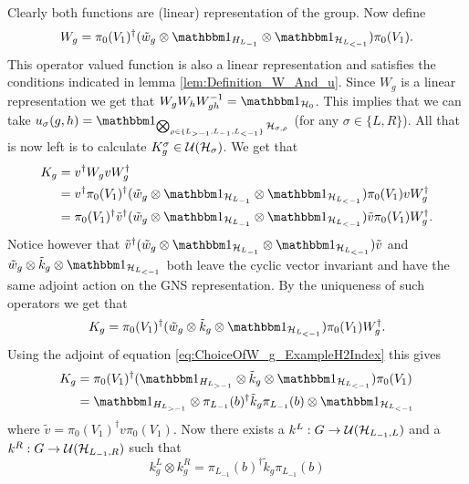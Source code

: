 \documentclass[12pt,a4paper,twoside]{article}
\numberwithin{equation}{section}
\begin{document}
Clearly both functions are (linear) representation of the group. Now define
\begin{equation}\label{eq:ChoiceOfW_g_ExampleH2Index}
	W_g=\pi_{0}(V_1)^{\dagger}(\tilde{w}_g\otimes\id_{H_{L_{-1}}}\otimes\id_{\HH_{L_{<-1}}}) \pi_{0}(V_1).
\end{equation}
This operator valued function is also a linear representation and satisfies the conditions indicated in lemma \ref{lem:Definition_W_And_u}. Since $W_g$ is a linear representation we get that $W_gW_hW_{gh}^{-1}=\id_{\HH_0}$. This implies that we can take $u_\sigma(g,h)=\id_{\bigotimes_{\rho\in\{L_{>-1},L_{-1},L_{<-1}\}}\HH_{\sigma,\rho}}$ (for any $\sigma\in\{L,R\}$). All that is now left is to calculate $K^\sigma_g\in\mathcal U(\mathcal H_\sigma)$. We get that
\begin{align}
	K_g&=v^\dagger W_g v W_g^\dagger\\
	&=v^\dagger \pi_{0}(V_1)^{\dagger}(\tilde{w}_g\otimes\id_{\HH_{L_{-1}}}\otimes\id_{\HH_{L_{<-1}}}) \pi_{0}(V_1) v W_g^\dagger\\
	&=\pi_{0}(V_1)^{\dagger}\tilde v^\dagger(\tilde{w}_g\otimes\id_{\HH_{L_{-1}}}\otimes\id_{\HH_{L_{<-1}}}) \tilde v \pi_{0}(V_1) W_g^\dagger.
\end{align}
Notice however that $\tilde v^\dagger(\tilde{w}_g\otimes\id_{\HH_{L_{-1}}}\otimes\id_{\HH_{L_{<-1}}}) \tilde v$ and $\tilde{w}_g\otimes\tilde{k}_g\otimes\id_{\HH_{L_{<-1}}}$ both leave the cyclic vector invariant and have the same adjoint action on the GNS representation. By the uniqueness of such operators we get that
\begin{equation}
	K_g=\pi_{0}(V_1)^{\dagger}(\tilde{w}_g\otimes\tilde{k}_g\otimes\id_{\HH_{L_{<-1}}}) \pi_{0}(V_1) W_g^\dagger.
\end{equation}
Using the adjoint of equation \eqref{eq:ChoiceOfW_g_ExampleH2Index} this gives
\begin{align}
	K_g&=\pi_{0}(V_1)^{\dagger}(\id_{H_{L_{>-1}}}\otimes \tilde k_g \otimes\id_{\HH_{L_{<-1}}}) \pi_{0}(V_1)\\
	&=\id_{H_{L_{>-1}}}\otimes \pi_{L_{-1}}(b)^\dagger \tilde k_g \pi_{L_{-1}}(b) \otimes\id_{\HH_{L_{<-1}}}
\end{align}
where $\tilde{v}=\pi_0(V_1)^\dagger v\pi_0(V_1)$. Now there exists a $k^L:G\rightarrow \mathcal U(\mathcal H_{L_{-1},L})$ and a $k^R:G\rightarrow \mathcal U(\mathcal H_{L_{-1},R})$ such that
\begin{equation}
	k^L_g\otimes k^R_g=\pi_{L_{-1}}(b)^\dagger \tilde k_g \pi_{L_{-1}}(b)
\end{equation}
\end{document}

